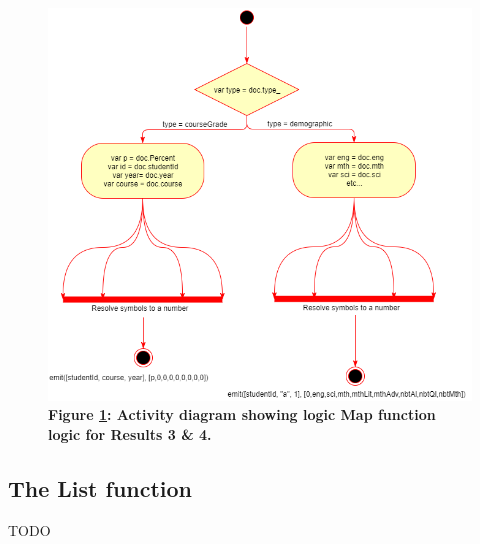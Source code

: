 \begin{figure}[ht]
    \centering
    \begin{mdframed}
        \centering
        \includegraphics[scale=0.35]{./resources/figures/activity-diagram-1.png}
    \end{mdframed}
    \caption[Result 1 Map function]{\textbf{Figure \ref{result-3-map-fn}: Activity diagram showing logic Map function logic for Results 3 \& 4.}}
    \label{result-3-map-fn}
\end{figure}

\subsection*{The List function}
TODO